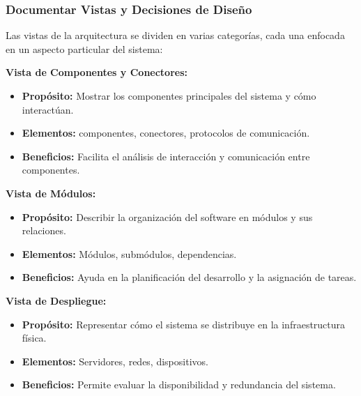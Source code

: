 \subsubsection{Documentar Vistas y Decisiones de Diseño}


Las vistas de la arquitectura se dividen en varias categorías, cada una enfocada en un aspecto particular del sistema:

\textbf{Vista de Componentes y Conectores:}
\begin{itemize}
    \item \textbf{Propósito:} Mostrar los componentes principales del sistema y cómo interactúan.
    \item \textbf{Elementos:} componentes, conectores, protocolos de comunicación.
    \item \textbf{Beneficios:} Facilita el análisis de interacción y comunicación entre componentes.
\end{itemize}

\textbf{Vista de Módulos:}
\begin{itemize}
    \item \textbf{Propósito:} Describir la organización del software en módulos y sus relaciones.
    \item \textbf{Elementos:} Módulos, submódulos, dependencias.
    \item \textbf{Beneficios:} Ayuda en la planificación del desarrollo y la asignación de tareas.
\end{itemize}

\textbf{Vista de Despliegue:}
\begin{itemize}
    \item \textbf{Propósito:} Representar cómo el sistema se distribuye en la infraestructura física.
    \item \textbf{Elementos:} Servidores, redes, dispositivos.
    \item \textbf{Beneficios:} Permite evaluar la disponibilidad y redundancia del sistema.
\end{itemize}

